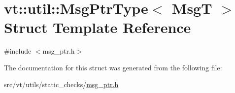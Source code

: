 \hypertarget{structvt_1_1util_1_1_msg_ptr_type}{}\section{vt\+:\+:util\+:\+:Msg\+Ptr\+Type$<$ MsgT $>$ Struct Template Reference}
\label{structvt_1_1util_1_1_msg_ptr_type}


{\ttfamily \#include $<$msg\+\_\+ptr.\+h$>$}



The documentation for this struct was generated from the following file\+:\begin{DoxyCompactItemize}
\item 
src/vt/utils/static\+\_\+checks/\hyperlink{msg__ptr_8h}{msg\+\_\+ptr.\+h}\end{DoxyCompactItemize}
